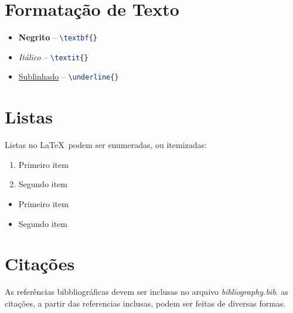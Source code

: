 \section{Formatação de Texto}
\label{sec:formatacao}

    \begin{itemize}
        \item \textbf{Negrito} -- \lstinline[language=TeX,style=code]|\textbf{}|
        \item \textit{Itálico} -- \lstinline[language=TeX,style=code]|\textit{}|
        \item \underline{Sublinhado} -- \lstinline[language=TeX,style=code]|\underline{}|
    \end{itemize}


\section{Listas}
\label{sec:listas}

    Listas no \LaTeX\ podem ser enumeradas, ou itemizadas:


    \begin{enumerate}
        \item Primeiro item
        \item Segundo item
    \end{enumerate}


    \begin{itemize}
        \item Primeiro item
        \item Segundo item
    \end{itemize}


\section{Citações}

    As referências bibbliográficas devem ser inclusas no arquivo \textit{bibliography.bib}.
    as citações, a partir das referencias inclusas, podem ser feitas de diversas formas.


